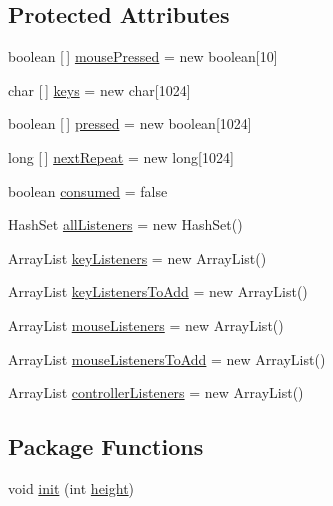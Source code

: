 \subsection*{Protected Attributes}
\begin{DoxyCompactItemize}
\item 
boolean \mbox{[}$\,$\mbox{]} \mbox{\hyperlink{classorg_1_1newdawn_1_1slick_1_1_input_a83047186fefd663f5749fcdf6bb3b20d}{mouse\+Pressed}} = new boolean\mbox{[}10\mbox{]}
\item 
char \mbox{[}$\,$\mbox{]} \mbox{\hyperlink{classorg_1_1newdawn_1_1slick_1_1_input_a2b4c556098d440654e51cae57d63e429}{keys}} = new char\mbox{[}1024\mbox{]}
\item 
boolean \mbox{[}$\,$\mbox{]} \mbox{\hyperlink{classorg_1_1newdawn_1_1slick_1_1_input_a3cc93977afce568be4f0f9dbb43fe722}{pressed}} = new boolean\mbox{[}1024\mbox{]}
\item 
long \mbox{[}$\,$\mbox{]} \mbox{\hyperlink{classorg_1_1newdawn_1_1slick_1_1_input_a7623aa278d694485dd000f6d98d1a515}{next\+Repeat}} = new long\mbox{[}1024\mbox{]}
\item 
boolean \mbox{\hyperlink{classorg_1_1newdawn_1_1slick_1_1_input_af37be3b950898acb03ac33cca068cc9a}{consumed}} = false
\item 
Hash\+Set \mbox{\hyperlink{classorg_1_1newdawn_1_1slick_1_1_input_a26d5ed77d8b0444118d630336d0ab6d7}{all\+Listeners}} = new Hash\+Set()
\item 
Array\+List \mbox{\hyperlink{classorg_1_1newdawn_1_1slick_1_1_input_a9a68e6a9e9441fea9793f57603be2f96}{key\+Listeners}} = new Array\+List()
\item 
Array\+List \mbox{\hyperlink{classorg_1_1newdawn_1_1slick_1_1_input_a3bd9ce9ac5e9ac18f297b2e4382d3db9}{key\+Listeners\+To\+Add}} = new Array\+List()
\item 
Array\+List \mbox{\hyperlink{classorg_1_1newdawn_1_1slick_1_1_input_a14f9c58eb48c498073f11c6934d92998}{mouse\+Listeners}} = new Array\+List()
\item 
Array\+List \mbox{\hyperlink{classorg_1_1newdawn_1_1slick_1_1_input_af264625d6cf3fdf932e01b8e07949878}{mouse\+Listeners\+To\+Add}} = new Array\+List()
\item 
Array\+List \mbox{\hyperlink{classorg_1_1newdawn_1_1slick_1_1_input_a762495b937bf0e42b5dbfaa29bdb1b98}{controller\+Listeners}} = new Array\+List()
\end{DoxyCompactItemize}
\subsection*{Package Functions}
\begin{DoxyCompactItemize}
\item 
void \mbox{\hyperlink{classorg_1_1newdawn_1_1slick_1_1_input_a793fc05d5ffdf793eac37e6577bace4c}{init}} (int \mbox{\hyperlink{classorg_1_1newdawn_1_1slick_1_1_input_a7d805ec6ad6944a4c48189e8435c3589}{height}})
\end{DoxyCompactItemize}

